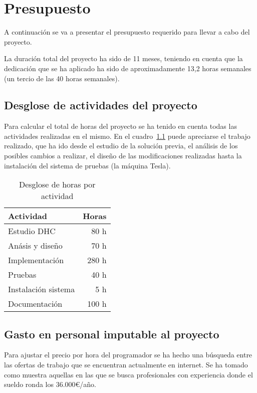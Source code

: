 \chapter{Presupuesto}

A continuación se va a presentar el presupuesto requerido para llevar a cabo del proyecto.

La duración total del proyecto ha sido de 11 meses, teniendo en cuenta que la dedicación que se ha aplicado ha sido de aproximadamente 13,2 horas semanales (un tercio de las 40 horas semanales).

\section{Desglose de actividades del proyecto}

Para calcular el total de horas del proyecto se ha tenido en cuenta todas las actividades realizadas en el mismo. En el cuadro~\ref{tab:des_horas} puede apreciarse el trabajo realizado, que ha ido desde el estudio de la solución previa, el análisis de los posibles cambios a realizar, el diseño de las modificaciones realizadas hasta la instalación del sistema de pruebas (la máquina Tesla).

\begin{table}
	\centering
	
	\begin{tabular}{|l|r|}
		\hline
		Actividad & Horas \\
		\hline
		Estudio DHC & 80 h \\
		\hline
		Anásis y diseño & 70 h \\
		\hline
		Implementación & 280 h \\
		\hline
		Pruebas & 40 h \\
		\hline
		Instalación sistema & 5 h \\
		\hline
		Documentación & 100 h \\
		\hline
	\end{tabular}
	\caption{Desglose de horas por actividad}\label{tab:des_horas}
\end{table}

\section{Gasto en personal imputable al proyecto}

Para ajustar el precio por hora del programador se ha hecho una búsqueda entre las ofertas de trabajo que se encuentran actualmente en internet. Se ha tomado como muestra aquellas en las que se busca profesionales con experiencia donde el sueldo ronda los 36.000\euro/año.

